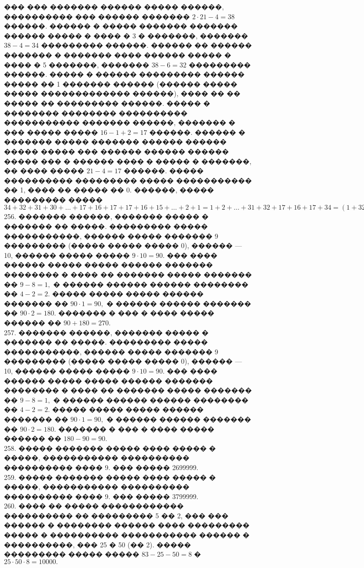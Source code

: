 \documentclass[12pt]{article}
\begin{document}
��� ��� ������� ������ ����� ������, ���������� ��� ������ ������� $2\cdot21-4=38$ ������. ������ � ����� ������� ������� ������ ����� � ���� � 3 � �������, ������� $38-4=34$ ��������� ������. ������ �� ������ ������� � ������� ���� ������ ����� � ���� � 5 �������, ������� $38-6=32$ ��������� ������. ����� � ������ ��������� ������ ����� �� 1 ������� ������ (������ ����� ����� ������������� ������), ���� �� �� ����� �� ��������� ������. ����� � �������� �������� ���������� ����������� ������� ������, ������� � ��� ����� ����� $16-1+2=17$ ������. ������ � ������� ����� ������� ������ ������ ����� ����� ��� ������ ������ ������ ����� ��� � ������ ���� � ����� � �������, �� ���� ����� $21-4=17$ ������. ����� ���������� ��������� ����� ����������� �� 1, ���� �� ����� �� 0. ������, ����� ��������� ����� $34+32+31+30+\ldots+17+16+17+17+16+15+\ldots+2+1=1+2+\ldots+31+32+17+16+17+34=(1+32)+(2+21)+\ldots+(16+17)+84=33\cdot16+84=612.$\\
256. ������� ������, ������� ����� � ������� �� �����. ��������� ����� �����������, ������ ����� ������� 9 ��������� (����� ����� ����� 0), ������ --- 10, ������ ����� ����� $9\cdot10=90.$ ��� ���� ������ ����� ����� ������ ������� �������� � ���� �� ������� ����� ������� �� $9-8=1,$ � ������ ������ ������ �������� �� $4-2=2.$ ����� ����� ����� ������ ������� �� $90\cdot1=90,$ � ������ ������ ������� �� $90\cdot2=180.$ ������� � ��� � ���� ����� ������ �� $90+180=270.$\\
257. ������� ������, ������� ����� � ������� �� �����. ��������� ����� �����������, ������ ����� ������� 9 ��������� (����� ����� ����� 0), ������ --- 10, ������ ����� ����� $9\cdot10=90.$ ��� ���� ������ ����� ����� ������ ������� �������� � ���� �� ������� ����� ������� �� $9-8=1,$ � ������ ������ ������ �������� �� $4-2=2.$ ����� ����� ����� ������ ������� �� $90\cdot1=90,$ � ������ ������ ������� �� $90\cdot2=180.$ ������� � ��� � ���� ����� ������ �� $180-90=90.$\\
258. ����� ������� ����� ���� ����� � �����, ����������� ���������� ���������� ���� 9. ��� ����� 2699999.\\
259. ����� ������� ����� ���� ����� � �����, ����������� ���������� ���������� ���� 9. ��� ����� 3799999.\\
260. ���� �� ����� ������������ ���������� �� ��������� 5 �� 2, ��� ��� ������ � �������� ������ ���� ��������� ����� � ���������� ����������� ������ � ����������, ��� 25 � 50 (�� 2). ����� ��������� ����� ����� $83-25-50=8$ � $25\cdot50\cdot8=10000.$\\
\end{document}
